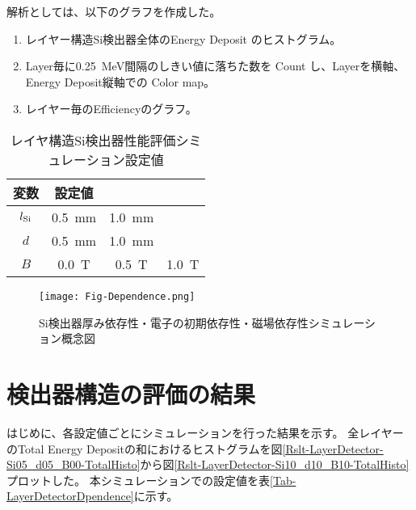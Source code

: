 \documentclass[a4paper,10pt]{jreport}
\begin{document}
解析としては、以下のグラフを作成した。

\begin{enumerate}
	\item レイヤー構造Si検出器全体のEnergy Deposit のヒストグラム。
	\item  Layer毎に\SI{0.25}{MeV}間隔のしきい値に落ちた数を Count し、Layerを横軸、Energy Deposit縦軸での Color map。
	\item レイヤー毎のEfficiencyのグラフ。
\end{enumerate}

\begin{table}[H] 
	\center
	\caption{レイヤ構造Si検出器性能評価シミュレーション設定値} \label{Tab-Dpendence}
	\begin{tabular}{cccc}
		\hline
		変数 & 設定値  \\
		\hline
		$l_{\rm{Si}}$ &  \SI{0.5}{mm} & \SI{1.0}{mm} & \\
		$d$ & \SI{0.5}{mm} & \SI{1.0}{mm} & \\
		$B$ & \SI{0.0}{T} & \SI{0.5}{T} & \SI{1.0}{T} \\
		\hline
	\end{tabular}
\end{table}

\begin{figure}[H]
	\center
	\texttt{[image: Fig-Dependence.png]}
	\caption{Si検出器厚み依存性・電子の初期依存性・磁場依存性シミュレーション概念図} \label{Fig-Dependence}
\end{figure}




\section{検出器構造の評価の結果}

はじめに、各設定値ごとにシミュレーションを行った結果を示す。
全レイヤーのTotal Energy Depositの和におけるヒストグラムを図\ref{Rslt-LayerDetector-Si05_d05_B00-TotalHisto}から図\ref{Rslt-LayerDetector-Si10_d10_B10-TotalHisto}プロットした。
本シミュレーションでの設定値を表\ref{Tab-LayerDetectorDpendence}に示す。
\end{document}
